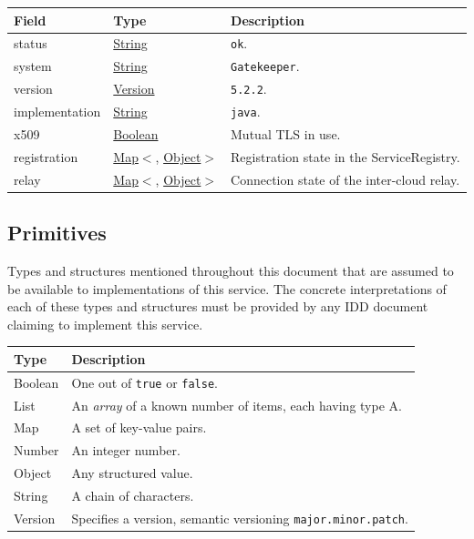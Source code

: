 \documentclass[a4paper]{arrowhead}
\newcommand{\pdef}[1]{{\textcolor{ArrowheadGrey}{#1\label{sec:model:primitives:#1}\label{sec:model:primitives:#1s}\label{sec:model:primitives:#1es}}}}
\newcommand{\pref}[1]{{\textcolor{ArrowheadGrey}{\hyperref[sec:model:primitives:#1]{#1}}}}
\begin{document}




\noindent\begin{tabularx}{\textwidth}{| >{\raggedright\arraybackslash}p{3.9cm} | >{\raggedright\arraybackslash\small}p{5.3cm} | X |} \hline
\rowcolor{gray!33} Field & Type & Description \\ \hline
status & \pref{String} & \texttt{ok}. \\ \hline
system & \pref{String} & \texttt{Gatekeeper}. \\ \hline
version & \pref{Version} & \texttt{5.\allowbreak{}2.\allowbreak{}2}. \\ \hline
implementation & \pref{String} & \texttt{java}. \\ \hline
x509 & \pref{Boolean} & Mutual TLS in use. \\ \hline
registration & \pref{Map}$<$\allowbreak{}\pref{String}, \pref{Object}$>$ & Registration state in the ServiceRegistry. \\ \hline
relay & \pref{Map}$<$\allowbreak{}\pref{String}, \pref{Object}$>$ & Connection state of the inter-cloud relay. \\ \hline
\end{tabularx}



\subsection{Primitives}
\label{sec:model:primitives}

Types and structures mentioned throughout this document that are assumed to be available to implementations of this service.
The concrete interpretations of each of these types and structures must be provided by any IDD document claiming to implement this service.

\noindent\begin{tabularx}{\textwidth}{| p{4.6cm} | X |} \hline
\rowcolor{gray!33} Type & Description \\ \hline
\pdef{Boolean} & One out of \texttt{true} or \texttt{false}. \\ \hline
\pdef{List} & An \textit{array} of a known number of items, each having type A. \\ \hline
\pdef{Map} & A set of key-value pairs. \\ \hline
\pdef{Number} & An integer number. \\ \hline
\pdef{Object} & Any structured value. \\ \hline
\pdef{String} & A chain of characters. \\ \hline
\pdef{Version} & Specifies a version, semantic versioning \texttt{major.minor.patch}. \\ \hline
\end{tabularx}
\end{document}
